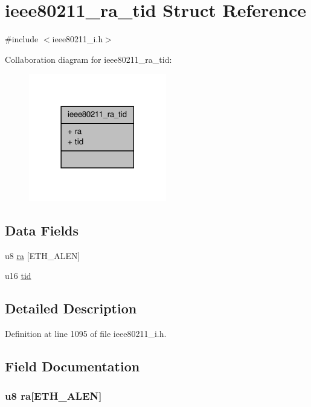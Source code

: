 \hypertarget{structieee80211__ra__tid}{\section{ieee80211\-\_\-ra\-\_\-tid Struct Reference}
\label{structieee80211__ra__tid}
}


{\ttfamily \#include $<$ieee80211\-\_\-i.\-h$>$}



Collaboration diagram for ieee80211\-\_\-ra\-\_\-tid\-:
\nopagebreak
\begin{figure}[H]
\begin{center}
\leavevmode
\includegraphics[width=170pt]{structieee80211__ra__tid__coll__graph}
\end{center}
\end{figure}
\subsection*{Data Fields}
\begin{DoxyCompactItemize}
\item 
u8 \hyperlink{structieee80211__ra__tid_a5c7e15726f46e9ea6315ce73ff303590}{ra} \mbox{[}E\-T\-H\-\_\-\-A\-L\-E\-N\mbox{]}
\item 
u16 \hyperlink{structieee80211__ra__tid_a7c32a30e0eb9aa589f779888e3d5ba40}{tid}
\end{DoxyCompactItemize}


\subsection{Detailed Description}


Definition at line 1095 of file ieee80211\-\_\-i.\-h.



\subsection{Field Documentation}
\hypertarget{structieee80211__ra__tid_a5c7e15726f46e9ea6315ce73ff303590}{
\subsubsection[{ra}]{\setlength{\rightskip}{0pt plus 5cm}u8 ra\mbox{[}E\-T\-H\-\_\-\-A\-L\-E\-N\mbox{]}}}\label{structieee80211__ra__tid_a5c7e15726f46e9ea6315ce73ff303590}


